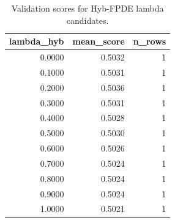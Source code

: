 \begin{table}[t]
\caption{Validation scores for Hyb-FPDE lambda candidates.}
\label{tab:lambda_distribution_computed}
\centering
\begin{tabular}{rrr}
\toprule
lambda\_hyb & mean\_score & n\_rows \\
\midrule
0.0000 & 0.5032 & 1 \\
0.1000 & 0.5031 & 1 \\
0.2000 & 0.5036 & 1 \\
0.3000 & 0.5031 & 1 \\
0.4000 & 0.5028 & 1 \\
0.5000 & 0.5030 & 1 \\
0.6000 & 0.5026 & 1 \\
0.7000 & 0.5024 & 1 \\
0.8000 & 0.5024 & 1 \\
0.9000 & 0.5024 & 1 \\
1.0000 & 0.5021 & 1 \\
\bottomrule
\end{tabular}

\end{table}
